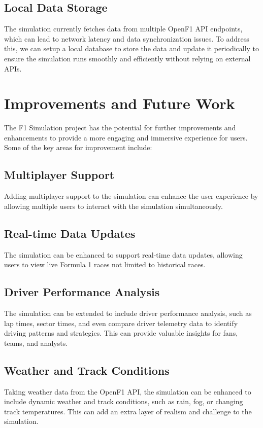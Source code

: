 \documentclass[
	a4paper, %
	10pt, %
	unnumberedsections, %
	twoside, %
]{LTJournalArticle}
\begin{document}
\subsection{Local Data Storage}
The simulation currently fetches data from multiple OpenF1 API endpoints, which can lead to network latency and data synchronization issues. To address this, we can setup a local database to store the data and update it periodically to ensure the simulation runs smoothly and efficiently without relying on external APIs.

\section{Improvements and Future Work}
The F1 Simulation project has the potential for further improvements and enhancements to provide a more engaging and immersive experience for users. Some of the key areas for improvement include:
\subsection{Multiplayer Support}
Adding multiplayer support to the simulation can enhance the user experience by allowing multiple users to interact with the simulation simultaneously. 

\subsection{Real-time Data Updates}
The simulation can be enhanced to support real-time data updates, allowing users to view live Formula 1 races not limited to historical races.

\subsection{Driver Performance Analysis}
The simulation can be extended to include driver performance analysis, such as lap times, sector times, and even compare driver telemetry data to identify driving patterns and strategies. This can provide valuable insights for fans, teams, and analysts.

\subsection{Weather and Track Conditions}
Taking weather data from the OpenF1 API, the simulation can be enhanced to include dynamic weather and track conditions, such as rain, fog, or changing track temperatures. This can add an extra layer of realism and challenge to the simulation.
\end{document}
